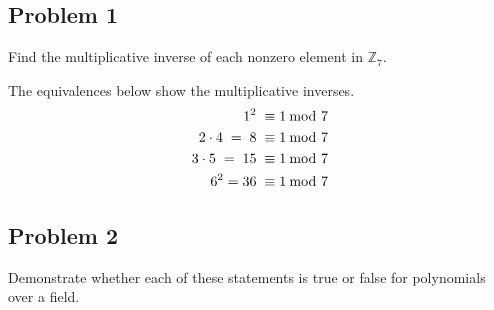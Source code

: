 \documentclass[../hw_sols.tex]{subfiles}
\begin{document}

\subsection*{Problem 1}

Find the multiplicative inverse of each nonzero element in $\mathbb{Z}_7$.

\begin{solution}
The equivalences below show the multiplicative inverses.
\begin{align*}
	1^2 \; \equiv& \; 1 \tmod{7} \\
	2 \cdot 4 \; = \; 8 \; \equiv& \; 1 \tmod{7} \\
	3 \cdot 5 \; = \; 15 \; \equiv& \; 1 \tmod{7} \\
	6^2 = 36 \; \equiv& \; 1 \tmod{7}
\end{align*}
\end{solution}


\newpage



\subsection*{Problem 2}

Demonstrate whether each of these statements is true or false for polynomials 
over a field.
\end{document}
